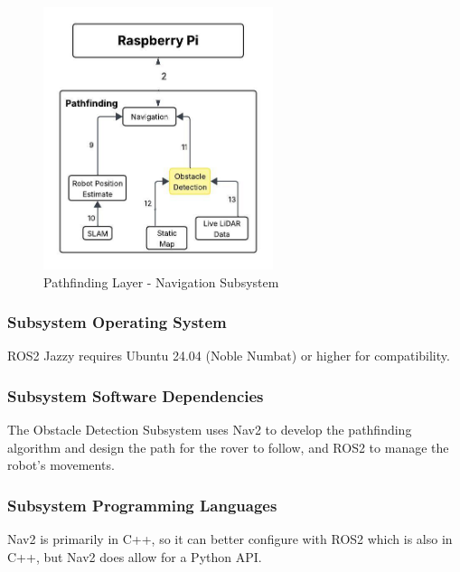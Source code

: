 \begin{figure}[h!]
	\centering
 	\includegraphics[width=0.60\textwidth]{images/pathfinding2nd/Data_Flow_ObstacleD.jpeg}
 \caption{Pathfinding Layer - Navigation Subsystem}
\end{figure}

\subsubsection{Subsystem Operating System}
ROS2 Jazzy requires Ubuntu 24.04 (Noble Numbat) or higher for compatibility.
\subsubsection{Subsystem Software Dependencies}
The Obstacle Detection Subsystem uses Nav2 to develop the pathfinding algorithm and design the path for the rover to follow, and ROS2 to manage the robot's movements.

\subsubsection{Subsystem Programming Languages}
Nav2 is primarily in C++, so it can better configure with ROS2 which is also in C++, but Nav2 does allow for a Python API.


